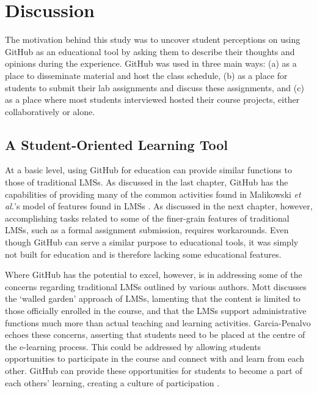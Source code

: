 

\section{Discussion}
The motivation behind this study was to uncover student perceptions on using GitHub as an educational tool by asking them to describe their thoughts and opinions during the experience. GitHub was used in three main ways: (a) as a place to disseminate material and host the class schedule, (b) as a place for students to submit their lab assignments and discuss these assignments, and (c) as a place where most students interviewed hosted their course projects, either collaboratively or alone.

\subsection{A Student-Oriented Learning Tool}
At a basic level, using GitHub for education can provide similar functions to those of traditional LMSs. As discussed in the last chapter, GitHub has the capabilities of providing many of the common activities found in Malikowski \textit{et al.}'s model of features found in LMSs \cite{malikowski2007model}. As discussed in the next chapter, however, accomplishing tasks related to some of the finer-grain features of traditional LMSs, such as a formal assignment submission, requires workarounds. Even though GitHub can serve a similar purpose to educational tools, it was simply not built for education and is therefore lacking some educational features.

Where GitHub has the potential to excel, however, is in addressing some of the concerns regarding traditional LMSs outlined by various authors. Mott \cite{mott2010envisioning} discusses the `walled garden' approach of LMSs, lamenting that the content is limited to those officially enrolled in the course, and that the LMSs support administrative functions much more than actual teaching and learning activities. Garcia-Penalvo \cite{garcia2011opening} echoes these concerns, asserting that students need to be placed at the centre of the e-learning process. This could be addressed by allowing students opportunities to participate in the course and connect with and learn from each other. GitHub can provide these opportunities for students to become a part of each others' learning, creating a culture of participation \cite{jenkins2009confronting}. \\


